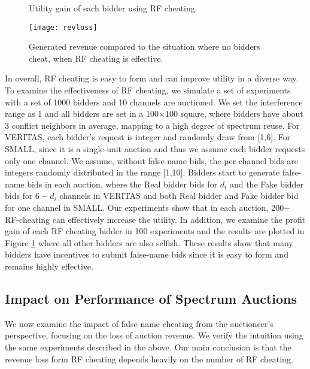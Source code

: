 \documentclass{sig-alternate}
\begin{document}
\begin{figure}[!t]
\centerline{
}
\caption{Utility gain of each bidder using RF cheating.}
\label{fig_ugain}
\end{figure}


\begin{figure}[!t]
\centering
\texttt{[image: revloss]}
\caption{Generated revenue compared to the situation where no bidders cheat, when RF cheating is effective.}
\label{fig_loss}
\end{figure}

In overall, RF cheating is easy to form and can improve utility in a diverse way. To examine the effectiveness of RF cheating, we simulate a set of experiments with a set of 1000 bidders and 10 channels are auctioned. We set the interference range as 1 and all bidders are set in a 100$\times$100 square, where bidders have about 3 conflict neighbors in average, mapping to a high degree of spectrum reuse. For VERITAS, each bidder's request is integer and randomly draw from [1,6]. For SMALL, since it is a single-unit auction and thus we assume each bidder requests only one channel. We assume, without false-name bids, the per-channel bids are integers randomly distributed in the range [1,10]. Bidders start to generate false-name bids in each auction, where the Real bidder bids for $d_i$ and the Fake bidder bids for $6-d_i$ channels in VERITAS and both Real bidder and Fake bidder bid for one channel in SMALL. Our experiments show that in each auction, 200+ RF-cheating can effectively increase the utility.
In addition, we examine the profit gain of each RF cheating bidder in 100 experiments and the results are plotted in Figure \ref{fig_ugain} where all other bidders are also selfish. These results show that many bidders have incentives to submit false-name bids since it is easy to form and remains highly effective.


\subsection{Impact on Performance of Spectrum Auctions}
We now examine the impact of false-name cheating from the auctioneer's perspective, focusing on the loss of auction revenue. We verify the intuition using the same experiments described in the above. Our main conclusion is that the revenue loss form RF cheating depends heavily on the number of RF cheating.
\end{document}
